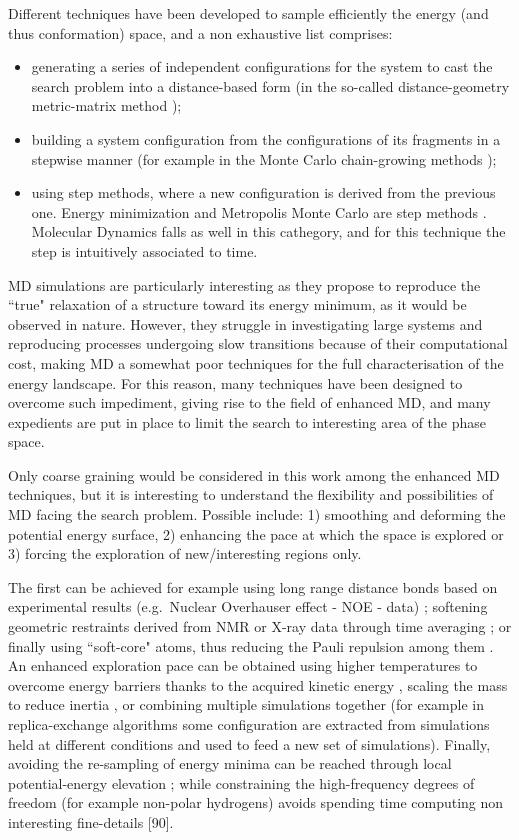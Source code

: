 Different techniques have been developed to sample efficiently the energy (and thus conformation) space, and a non exhaustive list comprises:
\begin{itemize}
\item generating a series of independent configurations for the system to cast the search problem into a distance-based form (in the so-called distance-geometry metric-matrix method \cite{72, 73});
\item building a system configuration from the configurations of its fragments in a stepwise manner (for example in the Monte Carlo chain-growing methods \cite{7, 78});
\item using step methods, where a new configuration is derived from the previous one. Energy minimization and Metropolis Monte Carlo are step methods \cite{80}. Molecular Dynamics falls as well in this cathegory, and for this technique the step is intuitively associated to time.
\end{itemize}
MD simulations are particularly interesting as they propose to reproduce the ``true" relaxation of a structure toward its energy minimum, as it would be observed in nature. However, they struggle in investigating large systems and reproducing processes undergoing slow transitions because of their computational cost, making MD a somewhat poor techniques for the full characterisation of the energy landscape.
%
For this reason, many techniques have been designed to overcome such impediment, giving rise to the field of enhanced MD, and many expedients are put in place to limit the search to interesting area of the phase space.

Only coarse graining would be considered in this work among the enhanced MD techniques, but it is interesting to understand the flexibility and possibilities of MD facing the search problem. Possible include: 1) smoothing and deforming the potential energy surface, 2) enhancing the pace at which the space is explored or 3) forcing the exploration of new/interesting regions only.

The first can be achieved for example using long range distance bonds based on experimental results (e.g.\ Nuclear Overhauser effect - NOE - data) \cite{82}; softening geometric restraints derived from NMR or X-ray data through time averaging \cite{87,88}; or finally using ``soft-core" atoms, thus reducing the Pauli repulsion among them \cite{83}.
%
An enhanced exploration pace can be obtained using higher temperatures to overcome energy barriers thanks to the acquired kinetic energy \cite{91}, scaling the mass to reduce inertia \cite{92}, or combining multiple simulations together (for example in replica-exchange algorithms \cite{62} some configuration are extracted from simulations held at different conditions and used to feed a new set of simulations).
%
Finally, avoiding the re-sampling of energy minima can be reached through local potential-energy elevation \cite{85,86}; while constraining the high-frequency degrees of freedom (for example non-polar hydrogens) avoids spending time computing non interesting fine-details [90].

